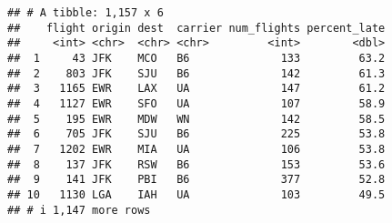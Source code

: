 \documentclass[
]{article}
\begin{document}
\begin{verbatim}
## # A tibble: 1,157 x 6
##    flight origin dest  carrier num_flights percent_late
##     <int> <chr>  <chr> <chr>         <int>        <dbl>
##  1     43 JFK    MCO   B6              133         63.2
##  2    803 JFK    SJU   B6              142         61.3
##  3   1165 EWR    LAX   UA              147         61.2
##  4   1127 EWR    SFO   UA              107         58.9
##  5    195 EWR    MDW   WN              142         58.5
##  6    705 JFK    SJU   B6              225         53.8
##  7   1202 EWR    MIA   UA              106         53.8
##  8    137 JFK    RSW   B6              153         53.6
##  9    141 JFK    PBI   B6              377         52.8
## 10   1130 LGA    IAH   UA              103         49.5
## # i 1,147 more rows
\end{verbatim}
\end{document}
